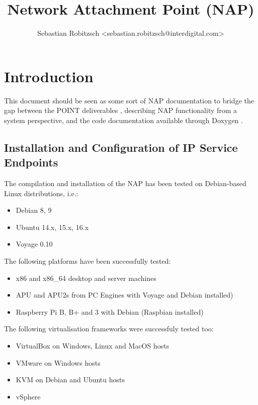 \documentclass[a4paper,11pt,titlepage]{report}
\title{\textbf{Network Attachment Point (NAP)}}
\author{Sebastian Robitzsch <sebastian.robitzsch@interdigital.com>}
\begin{document}
\setcounter{secnumdepth}{3} %
\lstset{language=C++}   
\maketitle
\tableofcontents
\newpage

\acresetall
\chapter{Introduction}\label{ch:Introduction}
This document should be seen as some sort of \ac{NAP} documentation to bridge the gap between the POINT deliverables \cite{POINT}, describing \ac{NAP} functionality from a system perspective, and the code documentation available through Doxygen \cite{Heesch}. 
\section{Installation and Configuration of IP Service Endpoints}
The compilation and installation of the \ac{NAP} has been tested on Debian-based Linux distributions, i.e.:

\begin{itemize}
	\item Debian 8, 9
	\item Ubuntu 14.x, 15.x, 16.x
	\item Voyage 0.10
\end{itemize}

The following platforms have been successfully tested:
\begin{itemize}
	\item x86 and x86\_64 desktop and server machines
	\item APU and APU2s from PC Engines with Voyage and Debian installed)
	\item Raspberry Pi B, B+ and 3 with Debian (Raspbian installed)
\end{itemize}

The following virtualisation frameworks were successfuly tested too:
\begin{itemize}
	\item VirtualBox on Windows, Linux and MacOS hosts
	\item VMware on Windows hosts
	\item KVM on Debian and Ubuntu hosts
	\item vSphere
\end{itemize}
\end{document}
